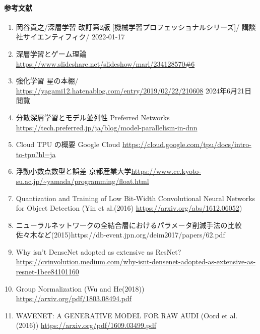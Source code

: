 \documentclass{ltjsarticle}
\begin{document}
\clearpage
\paragraph{参考文献}
\begin{enumerate}
  \item 岡谷貴之/深層学習 改訂第2版 [機械学習プロフェッショナルシリーズ]/ 講談社サイエンティフィク/ 2022-01-17
  \item 深層学習とゲーム理論 \url{https://www.slideshare.net/slideshow/marl/234128570#6}
  \item 強化学習 星の本棚/ \url{https://yagami12.hatenablog.com/entry/2019/02/22/210608} 2024年6月21日閲覧
  \item 分散深層学習とモデル並列性 Preferred Networks \url{https://tech.preferred.jp/ja/blog/model-parallelism-in-dnn}
  \item Cloud TPU の概要 Google Cloud \url{https://cloud.google.com/tpu/docs/intro-to-tpu?hl=ja}
  \item 浮動小数点数型と誤差 京都産業大学\url{https://www.cc.kyoto-su.ac.jp/~yamada/programming/float.html}
  \item Quantization and Training of Low Bit-Width Convolutional Neural Networks for Object Detection (Yin et al.(2016) \url{https://arxiv.org/abs/1612.06052})
  \item ニューラルネットワークの全結合層におけるパラメータ削減手法の比較 佐々木など(2015){https://db-event.jpn.org/deim2017/papers/62.pdf}
  \item Why isn’t DenseNet adopted as extensive as ResNet? \url{https://cvinvolution.medium.com/why-isnt-densenet-adopted-as-extensive-as-resnet-1bee84101160}
  \item Group Normalization (Wu and He(2018)) \url{https://arxiv.org/pdf/1803.08494.pdf}
  \item WAVENET: A GENERATIVE MODEL FOR RAW AUDI (Oord et al.(2016)) \url{https://arxiv.org/pdf/1609.03499.pdf}
\end{enumerate}

\newpage
\end{document}

